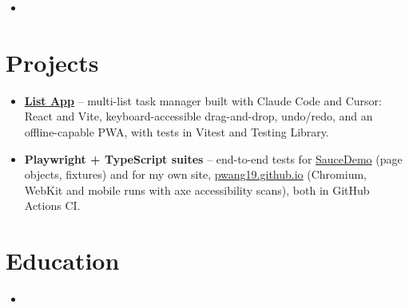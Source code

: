 \documentclass[10pt,letterpaper,sans]{moderncv}
\begin{document}
\begin{itemize}
\item{}
\end{itemize}

\section{Projects}
\vspace{1pt}
\begin{itemize}
\item {\textbf{\href{https://github.com/pwang19/listapp}{List App}} -- multi-list task manager built with Claude Code and Cursor: React and Vite, keyboard-accessible drag-and-drop, undo/redo, and an offline-capable PWA, with tests in Vitest and Testing Library.}
\item {\textbf{Playwright + TypeScript suites} -- end-to-end tests for \href{https://github.com/pwang19/saucedemo-playwright}{SauceDemo} (page objects, fixtures) and for my own site, \href{https://github.com/pwang19/pwang19.github.io}{pwang19.github.io} (Chromium, WebKit and mobile runs with axe accessibility scans), both in GitHub Actions CI.}
\end{itemize}

\section{Education}
\vspace{1pt}
\begin{itemize}
\item{}
\end{itemize}
\end{document}
